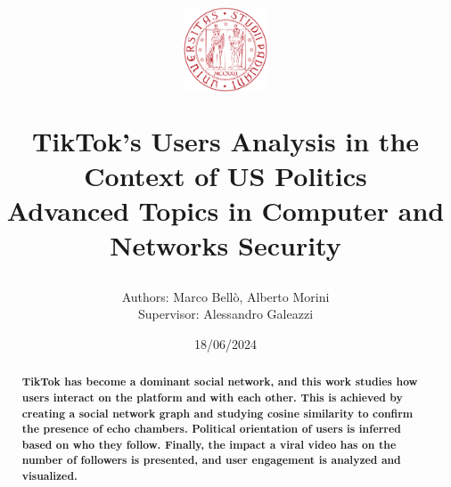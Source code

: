 \documentclass[twocolumn]{article}
\title{
    \vspace{-1cm}
    \includegraphics[height=2.5cm]{images/logo_unipd.png}
    \par
    \vspace{0.5cm}
    \textbf{TikTok's Users Analysis in the Context of US Politics}\\
    Advanced Topics in Computer and Networks Security
}
\author{
    Authors: {Marco Bellò, Alberto Morini} \\
    Supervisor: {Alessandro Galeazzi}
}
\date{18/06/2024}
\begin{document}
\maketitle

\begin{abstract}
    \textbf{TikTok has become a dominant social network, and this work studies how users interact on the platform and with each other. This is achieved by creating a social network graph and studying cosine similarity to confirm the presence of echo chambers. Political orientation of users is inferred based on who they follow. Finally, the impact a viral video has on the number of followers is presented, and user engagement is analyzed and visualized.
    }
\end{abstract}










\end{document}
